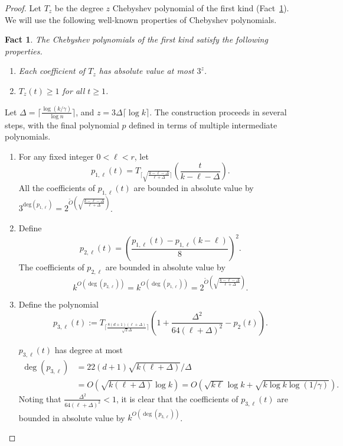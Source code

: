 \documentclass[11pt]{article}
\newtheorem{fact}[theorem]{Fact}
\theoremstyle{definition}
\begin{document}
\begin{proof}
Let $T_z$ be the degree $z$ Chebyshev polynomial of the first kind (Fact~\ref{fact:coeff}). We will use the following well-known properties of Chebyshev polynomials.

\begin{fact} \label{fact:coeff} The Chebyshev polynomials of the first kind satisfy the following properties.

\begin{enumerate}
\item Each coefficient of $T_z$ has absolute value at most $3^z$.
\item $T_z(t) \geq 1$ for all $t \geq 1$. 
\end{enumerate}
\end{fact} 

Let $\Delta = \big\lceil \frac{\log(k / \gamma)}{\log n}\big\rceil$, and $z=3\Delta\big\lceil \log k\big\rceil$. 
The construction proceeds in several steps, with the final polynomial $p$ defined in terms of multiple intermediate polynomials. 

\begin{enumerate}
\item For any fixed integer $0<\ell<r$,  let 
$$p_{1, \ell}(t) = T_{\big\lceil\sqrt{\frac{k-\ell-\Delta}{\ell+\Delta}}\big\rceil}\left(\frac{t}{k-\ell-\Delta}\right).$$ 
All the coefficients of $p_{1, \ell}(t)$ are bounded in absolute value by $3^{\text{deg}(p_{1, \ell})} = 2^{\tilde{O}\left(\sqrt{\frac{k-\ell-\Delta}{\ell+\Delta}}\right)}$.  

\item Define $$p_{2, \ell}(t) = \left(\frac{p_{1, \ell}(t)-p_{1, \ell}(k-\ell)}{8}\right)^2.$$ The coefficients of $p_{2, \ell}$ are bounded in absolute value by 
$$k^{O(\deg(p_{2, \ell}))}= k^{O(\deg(p_{1, \ell}))} = 2^{\tilde{O}\left(\sqrt{\frac{k-\ell-\Delta}{\ell+\Delta}}\right)}.$$

\item Define the polynomial $$p_{3, \ell}(t):=T_{\big\lceil\frac{8(d+1)(\ell+\Delta)}{\sqrt{2}\Delta}\big\rceil}\left(1 + \frac{\Delta^2}{64(\ell + \Delta)^2}-p_2(t)\right).$$

$p_{3, \ell}(t)$ has degree at most 
\begin{align*}
\deg(p_{3, \ell})
&={} 22(d+1)\sqrt{k(\ell+\Delta)}/\Delta \\
&={} O\left(\sqrt{k(\ell+\Delta)} \log k\right) = O\left(\sqrt{k \ell}\log k + \sqrt{k \log k \log(1/\gamma)}\right).
\end{align*}
Noting that $\frac{\Delta^2}{64(\ell + \Delta)^2} < 1$, it is clear that the coefficients of $p_{3, \ell}(t)$ are bounded in absolute value by $k^{O(\deg(p_{3, \ell}))}$.


\end{enumerate}
\end{proof}
\end{document}
